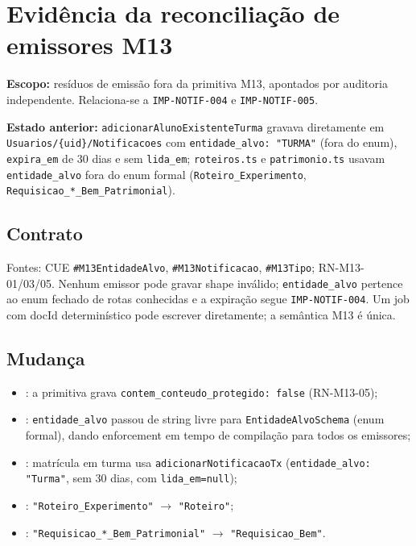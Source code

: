 \section{Evidência da reconciliação de emissores M13}

\textbf{Escopo:} resíduos de emissão fora da primitiva M13, apontados por
auditoria independente. Relaciona-se a \texttt{IMP-NOTIF-004} e
\texttt{IMP-NOTIF-005}.

\textbf{Estado anterior:} \texttt{adicionarAlunoExistenteTurma} gravava
diretamente em \texttt{Usuarios/\{uid\}/Notificacoes} com
\texttt{entidade\_alvo: "TURMA"} (fora do enum), \texttt{expira\_em} de 30 dias
e sem \texttt{lida\_em}; \texttt{roteiros.ts} e \texttt{patrimonio.ts} usavam
\texttt{entidade\_alvo} fora do enum formal
(\texttt{Roteiro\_Experimento}, \texttt{Requisicao\_*\_Bem\_Patrimonial}).

\subsection{Contrato}

Fontes: CUE \texttt{\#M13EntidadeAlvo}, \texttt{\#M13Notificacao},
\texttt{\#M13Tipo}; RN-M13-01/03/05. Nenhum emissor pode gravar shape inválido;
\texttt{entidade\_alvo} pertence ao enum fechado de rotas conhecidas e a
expiração segue \texttt{IMP-NOTIF-004}. Um job com docId determinístico pode
escrever diretamente; a semântica M13 é única.

\subsection{Mudança}

\begin{itemize}
  \item {}: a primitiva grava
  \texttt{contem\_conteudo\_protegido: false} (RN-M13-05);
  \item {}: \texttt{entidade\_alvo}
  passou de string livre para \texttt{EntidadeAlvoSchema} (enum formal), dando
  enforcement em tempo de compilação para todos os emissores;
  \item {}: matrícula em turma usa
  \texttt{adicionarNotificacaoTx} (\texttt{entidade\_alvo: "Turma"}, sem 30 dias,
  com \texttt{lida\_em=null});
  \item {}: \texttt{"Roteiro\_Experimento"} $\rightarrow$
  \texttt{"Roteiro"};
  \item {}: \texttt{"Requisicao\_*\_Bem\_Patrimonial"}
  $\rightarrow$ \texttt{"Requisicao\_Bem"}.
\end{itemize}

